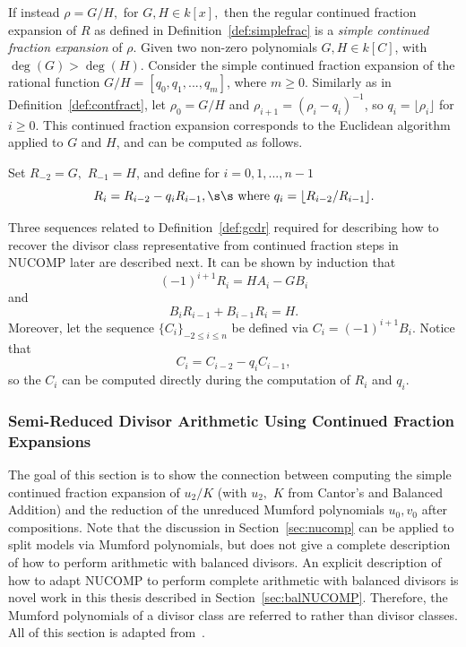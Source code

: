 \bd\label{def:gcdr} \cite[Adapted from
Section~2.1]{ImbertJacobsonSchmidt_NUCOMP_2010}
If instead $\rho = G/H,$ for $G,H \in k[x],$ then the regular continued fraction
expansion of $R$ as defined in Definition~\ref{def:simplefrac} is a \emph{simple
continued fraction expansion} of $\rho$. Given two non-zero polynomials $G,H \in
k[C]$, with $\deg(G) > \deg(H)$. Consider the simple continued fraction
expansion of the rational function $G/H = [q_0,q_1,...,q_m]$, where $m \geq 0$.
Similarly as in Definition~\ref{def:contfract}, let $\rho_0 = G/H$ and
$\rho_{i+1} = (\rho_i - q_i)^{-1}$, so $q_i = \lfloor \rho_i \rfloor$ for $i
\geq 0$. This continued fraction expansion corresponds to the Euclidean
algorithm applied to $G$ and $H$, and can be computed as follows. 

Set $R_{-2} = G,$ $R_{-1} = H$, and define for $i = 0,1,...,n-1$ $$R_i = R_{i-2}
- q_iR_{i-1}, \s\s \mbox{ where } q_i = \lfloor R_{i-2}/R_{i-1} \rfloor.$$
\ed

Three sequences related to Definition~\ref{def:gcdr} required for describing how to
recover the divisor class representative from continued fraction steps in NUCOMP
later are described next. It can be shown by induction that
\begin{equation}\label{eq:4}
(-1)^{i+1}R_i = HA_i - GB_i
\end{equation} and 
\begin{equation}\label{eq:5}
B_iR_{i-1} + B_{i-1}R_i = H.
\end{equation} Moreover, let the sequence $\{C_i\}_{-2\leq i \leq n}$ be defined via $C_i = 
(-1)^{i+1}B_i$. Notice that \begin{equation} \label{eq:C}
    C_i = C_{i-2} - q_iC_{i-1},
\end{equation} so the $C_i$ can be
computed directly during the computation of $R_i$ and $q_i$. 


\subsubsection{Semi-Reduced Divisor Arithmetic Using Continued Fraction
Expansions}\label{sec:connection} The goal of this section is to show the
connection between computing the simple continued fraction expansion of $u_2/K$
(with $u_2,$ $K$ from Cantor's and Balanced Addition) and the reduction of the
unreduced Mumford polynomials $u_0,v_0$ after compositions. Note that the
discussion in Section~\ref{sec:nucomp} can be applied to split models via
Mumford polynomials, but does not give a complete description of how to perform
arithmetic with balanced divisors. An explicit description of how to adapt
NUCOMP to perform complete arithmetic with balanced divisors is novel work in
this thesis described in Section~\ref{sec:balNUCOMP}. Therefore, the Mumford
polynomials of a divisor class are referred to rather than divisor classes. All
of this section is adapted from~\cite{ImbJac13:amc}.

